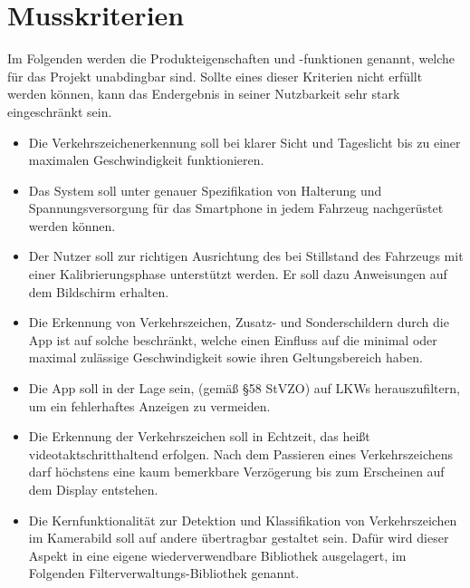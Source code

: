 \documentclass[12pt,a4paper,ngerman,enabledeprecatedfontcommands]{scrreprt}
\begin{document}
\section{Musskriterien}
\label{sec:musskriterien}
Im Folgenden werden die Produkteigenschaften und -funktionen genannt, welche für das Projekt unabdingbar sind. Sollte eines dieser Kriterien nicht erfüllt werden können, kann das Endergebnis in seiner Nutzbarkeit sehr stark eingeschränkt sein.

\begin{itemize}

\item Die Verkehrszeichenerkennung soll bei klarer Sicht und Tageslicht bis zu einer maximalen Geschwindigkeit funktionieren.

\item Das \gls{System} soll unter genauer Spezifikation von Halterung und Spannungsversorgung für das \gls{Smartphone} in jedem \gls{Fahrzeug} nachgerüstet werden können.

\item Der \gls{Nutzer} soll zur richtigen Ausrichtung des  bei Stillstand des Fahrzeugs mit einer Kalibrierungsphase unterstützt werden. Er soll dazu Anweisungen auf dem Bildschirm erhalten.

\item Die Erkennung von Verkehrszeichen, Zusatz- und Sonderschildern durch die \gls{App} ist auf solche beschränkt, welche einen Einfluss auf die minimal oder maximal zulässige Geschwindigkeit sowie ihren Geltungsbereich haben.

\item Die \gls{App} soll in der Lage sein,  (gemäß §58 \gls{StVZO}) auf LKWs herauszufiltern, um ein fehlerhaftes Anzeigen zu vermeiden.

\item Die Erkennung der Verkehrszeichen soll in Echtzeit, das heißt videotaktschritthaltend erfolgen. Nach dem Passieren eines Verkehrszeichens darf höchstens eine kaum bemerkbare Verzögerung bis zum Erscheinen auf dem Display entstehen.

\item Die Kernfunktionalität zur \gls{Detektion} und \gls{Klassifikation} von Verkehrszeichen im Kamerabild soll auf andere  übertragbar gestaltet sein. Dafür wird dieser Aspekt in eine eigene wiederverwendbare Bibliothek ausgelagert, im Folgenden \glqq\gls{Filterverwaltungs-Bibliothek}\grqq{} genannt.
\end{itemize}
\end{document}
